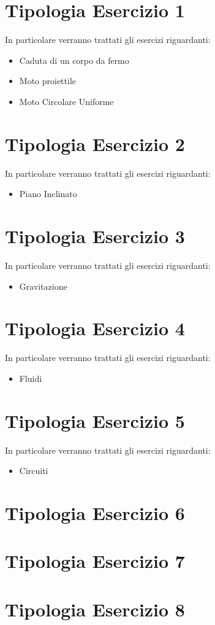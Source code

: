 \documentclass{article}
\begin{document}

\newpage

\tableofcontents

\newpage
\section{Tipologia Esercizio 1}
In particolare verranno trattati gli esercizi riguardanti:
\begin{itemize}
\item Caduta di un corpo da fermo
\item Moto proiettile
\item Moto Circolare Uniforme
\end{itemize}





\clearpage
\newpage
\section{Tipologia Esercizio 2}
In particolare verranno trattati gli esercizi riguardanti:
\begin{itemize}
\item Piano Inclinato 
\end{itemize}




\clearpage
\section{Tipologia Esercizio 3}
In particolare verranno trattati gli esercizi riguardanti:
\begin{itemize}
\item Gravitazione
\end{itemize}




\clearpage

\section{Tipologia Esercizio 4}
In particolare verranno trattati gli esercizi riguardanti:
\begin{itemize}
\item Fluidi
\end{itemize}




\clearpage
\section{Tipologia Esercizio 5}
In particolare verranno trattati gli esercizi riguardanti:
\begin{itemize}
\item Circuiti 
\end{itemize}



\clearpage
\section{Tipologia Esercizio 6}
\section{Tipologia Esercizio 7}
\section{Tipologia Esercizio 8}
\end{document}
